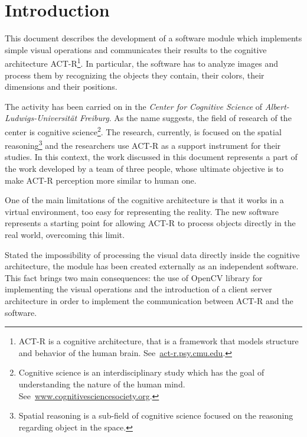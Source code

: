 \chapter{Introduction}
	This document describes the development of a software module which implements simple visual operations and communicates their results to the cognitive architecture \mbox{ACT-R}\footnote{ACT-R is a cognitive architecture, that is a framework that models structure and behavior of the human brain. See~\url{act-r.psy.cmu.edu}.}.
	In particular, the software has to analyze images and process them by recognizing the objects they contain, their colors, their dimensions and their positions.
	

	The activity has been carried on in the \emph{Center for Cognitive Science} of \emph{Albert-Ludwigs-Universität Freiburg}. 
	As the name suggests, the field of research of the center is cognitive science\footnote{Cognitive science is an interdisciplinary study which has the goal of understanding the nature of the human mind. See~\url{www.cognitivesciencesociety.org}.}.
	The research, currently, is focused on the spatial reasoning\footnote{Spatial reasoning is a sub-field of cognitive science focused on the reasoning regarding object in the space.} and the researchers use \mbox{ACT-R} as a support instrument for their studies. 
	In this context, the work discussed in this document represents a part of the work developed by a team of three people, whose ultimate objective is to make \mbox{ACT-R} perception more similar to human one.

	One of the main limitations of the cognitive architecture is that it works in a virtual environment, too easy for representing the reality. 
	The new software represents a starting point for allowing \mbox{ACT-R} to process objects directly in the real world, overcoming this limit.
	
	Stated the impossibility of processing the visual data directly inside the cognitive architecture, the module has been created externally as an independent software.
	This fact brings two main consequences: the use of OpenCV library for implementing the visual operations and the introduction of a client server architecture in order to implement the communication between \mbox{ACT-R} and the software.

